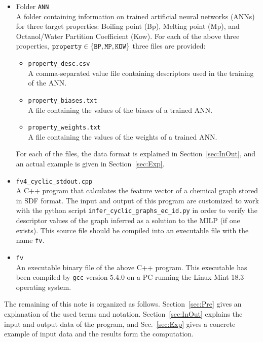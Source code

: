 \documentclass[11pt, titlepage, dvipdfmx, twoside]{article}
\begin{document}
\begin{itemize}
\begin{itemize}
\item Folder {\tt ANN}\\
A folder containing information on trained artificial neural networks (ANNs) for three target properties:
Boiling point (Bp), Melting point (Mp), and Octanol/Water Partition Coefficient (Kow).
For each of the above three properties, ${\tt property} \in \{{\tt BP, MP, KOW}\}$ three files are provided:
%
\begin{itemize}
\item {\tt property\_desc.csv}\\
A comma-separated value file containing descriptors
used in the training of the ANN.

\item {\tt property\_biases.txt}\\
A file containing the values of the biases of a trained ANN.

\item {\tt property\_weights.txt}\\
A file containing the values of the weights of a trained ANN.
\end{itemize}
%
For each of the files, the data format is explained in Section~\ref{sec:InOut},
and an actual example is given in Section~\ref{sec:Exp}.

\item {\tt fv4\_cyclic\_stdout.cpp}\\
A C++ program that calculates the feature vector of 
a chemical graph stored in SDF format.
The input and output of this program are customized to work with 
the python script {\tt infer\_cyclic\_graphs\_ec\_id.py}
in order to verify the descriptor values
of the graph inferred as a solution to the MILP (if one exists).
This source file should be compiled into an executable file
with the name {\tt fv}.

\item {\tt fv}\\
An executable binary file of the above C++ program.
This executable has been compiled 
by {\tt gcc} version 5.4.0
on a PC running the Linux Mint 18.3 operating system.
%
\end{itemize}
\end{itemize}



The remaining of this note is organized as follows.
Section~\ref{sec:Pre} gives an explanation 
of the used terms and notation.
%
Section~\ref{sec:InOut} explains the 
input and output data of the program,
and Sec.~\ref{sec:Exp} gives a concrete
example of input data and the results form the computation.
\end{document}
